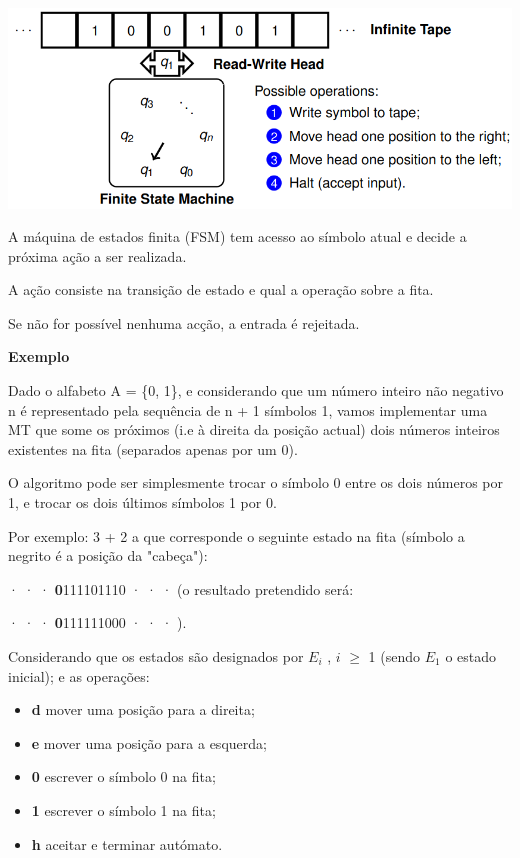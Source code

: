 \documentclass{article}
\begin{document}
\begin{center}
  \includegraphics[scale=0.35]{15}
\end{center}

\begin{flushleft}
  \item A máquina de estados finita (FSM) tem acesso ao símbolo
  atual e decide a próxima ação a ser realizada.
  \item A ação consiste na transição de estado e qual a
  operação sobre a fita.
  \item Se não for possível nenhuma acção, a entrada é rejeitada.
\end{flushleft}

\begin{flushleft}
  \textbf{Exemplo}
\end{flushleft}

\begin{flushleft}
  \item Dado o alfabeto A = \{0, 1\}, e considerando que um
  número inteiro não negativo n é representado pela
  sequência de n + 1 símbolos 1, vamos implementar uma
  MT que some os próximos (i.e à direita da posição actual)
  dois números inteiros existentes na fita (separados
  apenas por um 0).
  \item O algoritmo pode ser simplesmente trocar o símbolo 0
  entre os dois números por 1, e trocar os dois últimos
  símbolos 1 por 0.
  \item Por exemplo: 3 + 2 a que corresponde o seguinte estado
  na fita (símbolo a negrito é a posição da "cabeça"):

  · · · \textbf{0}111101110 · · · (o resultado pretendido será:

  · · · \textbf{0}111111000 · · · ).\break

  Considerando que os estados são designados por
  $E_i$ , $i$ $\ge$ 1 (sendo $E_1$ o estado inicial); e as operações:
  \begin{itemize}
    \item \textbf{d} mover uma posição para a direita;
    \item \textbf{e} mover uma posição para a esquerda;
    \item \textbf{0} escrever o símbolo 0 na fita;
    \item \textbf{1} escrever o símbolo 1 na fita;
    \item \textbf{h} aceitar e terminar autómato.
  \end{itemize}
\end{flushleft}
\end{document}
